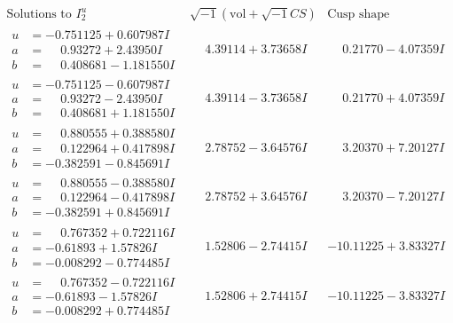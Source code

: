 \documentclass[1p]{elsarticle_modified}
\theoremstyle{definition}
\newcommand{\I}{\sqrt{-1}}
\begin{document}
$$\begin{array}{c|c|c}  
\text{Solutions to }I^u_{2}& \I (\text{vol} + \sqrt{-1}CS) & \text{Cusp shape}\\
 \hline 
\begin{aligned}
u &= -0.751125 + 0.607987 I \\
a &= \phantom{-}0.93272 + 2.43950 I \\
b &= \phantom{-}0.408681 - 1.181550 I\end{aligned}
 & \phantom{-}4.39114 + 3.73658 I & \phantom{-}0.21770 - 4.07359 I \\ \hline\begin{aligned}
u &= -0.751125 - 0.607987 I \\
a &= \phantom{-}0.93272 - 2.43950 I \\
b &= \phantom{-}0.408681 + 1.181550 I\end{aligned}
 & \phantom{-}4.39114 - 3.73658 I & \phantom{-}0.21770 + 4.07359 I \\ \hline\begin{aligned}
u &= \phantom{-}0.880555 + 0.388580 I \\
a &= \phantom{-}0.122964 + 0.417898 I \\
b &= -0.382591 - 0.845691 I\end{aligned}
 & \phantom{-}2.78752 - 3.64576 I & \phantom{-}3.20370 + 7.20127 I \\ \hline\begin{aligned}
u &= \phantom{-}0.880555 - 0.388580 I \\
a &= \phantom{-}0.122964 - 0.417898 I \\
b &= -0.382591 + 0.845691 I\end{aligned}
 & \phantom{-}2.78752 + 3.64576 I & \phantom{-}3.20370 - 7.20127 I \\ \hline\begin{aligned}
u &= \phantom{-}0.767352 + 0.722116 I \\
a &= -0.61893 + 1.57826 I \\
b &= -0.008292 - 0.774485 I\end{aligned}
 & \phantom{-}1.52806 - 2.74415 I & -10.11225 + 3.83327 I \\ \hline\begin{aligned}
u &= \phantom{-}0.767352 - 0.722116 I \\
a &= -0.61893 - 1.57826 I \\
b &= -0.008292 + 0.774485 I\end{aligned}
 & \phantom{-}1.52806 + 2.74415 I & -10.11225 - 3.83327 I \\ \hline\begin{aligned}

\end{aligned}
\end{array}$$
\end{document}
